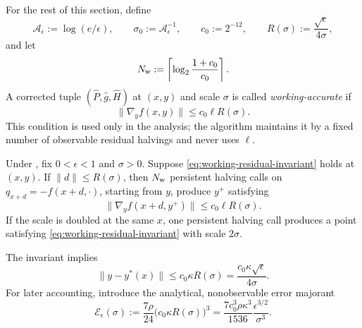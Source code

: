 \documentclass{article}
\begin{document}
For the rest of this section, define
\begin{equation}\label{eq:fixed-radius-parameters}
 \mathcal A_\epsilon:=\log(e/\epsilon),
 \qquad
 \sigma_0:=\mathcal A_\epsilon^{-1},
 \qquad
 c_0:=2^{-12},
 \qquad
 R(\sigma):=\frac{\sqrt\epsilon}{4\sigma},
\end{equation}
and let
\begin{equation}\label{eq:working-half-count}
 N_{\rm w}:=
 \left\lceil\log_2\frac{1+c_0}{c_0}\right\rceil.
\end{equation}
A corrected tuple $(\widehat P,\widehat g,\widehat H)$ at $(x,y)$ and
scale $\sigma$ is called \emph{working-accurate} if
\begin{equation}\label{eq:working-residual-invariant}
 \|\nabla_yf(x,y)\|
 \le c_0\ell R(\sigma).
\end{equation}
This condition is used only in the analysis; the algorithm maintains
it by a fixed number of observable residual halvings and never uses
$\ell$.

\begin{lemma}
\label{lem:working-residual-invariant}
Under , fix $0<\epsilon<1$ and $\sigma>0$.  Suppose
\eqref{eq:working-residual-invariant} holds at $(x,y)$.
If $\|d\|\le R(\sigma)$, then $N_{\rm w}$ persistent halving calls on
$q_{x+d}=-f(x+d,\cdot)$, starting from $y$, produce $y^+$ satisfying
\[
 \|\nabla_yf(x+d,y^+)\|
 \le c_0\ell R(\sigma).
\]
If the scale is doubled at the same $x$, one persistent halving call
produces a point satisfying
\eqref{eq:working-residual-invariant} with scale $2\sigma$.
\end{lemma}




The invariant implies
\begin{equation}\label{eq:working-distance-bound}
 \|y-y^*(x)\|
 \le c_0\kappa R(\sigma)
 =\frac{c_0\kappa\sqrt\epsilon}{4\sigma}.
\end{equation}
For later accounting, introduce the analytical, nonobservable error
majorant
\begin{equation}\label{eq:fixed-radius-proxy-error}
 \mathcal E_\epsilon(\sigma):=
 \frac{7\rho}{24}\bigl(c_0\kappa R(\sigma)\bigr)^3
 =\frac{7c_0^3\rho\kappa^3}{1536}
       \frac{\epsilon^{3/2}}{\sigma^3}.
\end{equation}
\end{document}
